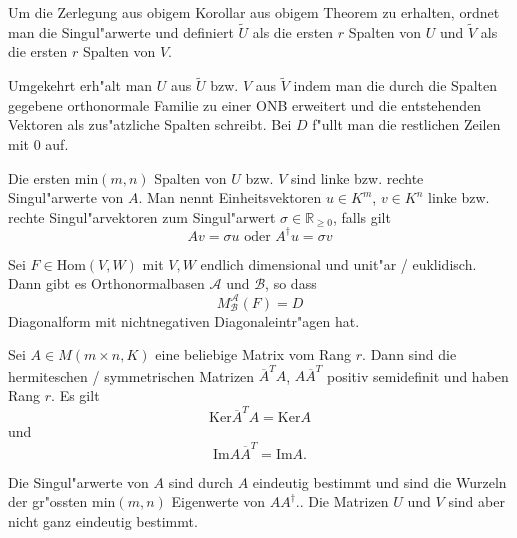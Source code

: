 \documentclass[8pt, a4paper, twocolumn, landscape]{article}
\begin{document}
{\begin{remark}
Um die Zerlegung aus obigem Korollar aus obigem Theorem zu erhalten, ordnet man die Singul"arwerte und definiert $\tilde{U}$ als die ersten $r$ Spalten von $U$ und $\tilde{V}$ als die ersten $r$ Spalten von $V$.

Umgekehrt erh"alt man $U$ aus $\tilde{U}$ bzw. $V$ aus $\tilde{V}$ indem man die durch die Spalten gegebene orthonormale Familie zu einer ONB erweitert und die entstehenden Vektoren als zus"atzliche Spalten schreibt. Bei $D$ f"ullt man die restlichen Zeilen mit $0$ auf.
\end{remark}



\begin{definition}
Die ersten $\mathrm{min}(m, n)$ Spalten von $U$ bzw. $V$ sind linke bzw. rechte Singul"arwerte von $A$. Man nennt Einheitsvektoren $u \in K^m$, $v \in K^n$ linke bzw. rechte Singul"arvektoren zum Singul"arwert $\sigma \in \mathbb{R}_{\geq 0}$, falls gilt
$$
Av = \sigma u \text{ oder } A^\dagger u = \sigma v
$$
\end{definition}

\begin{corollary}
Sei $F \in \mathrm{Hom}(V, W)$ mit $V, W$ endlich dimensional und unit"ar / euklidisch. Dann gibt es Orthonormalbasen $\mathcal{A}$ und $\mathcal{B}$, so dass 
$$
M^\mathcal{A}_\mathcal{B}(F) = D
$$
Diagonalform mit nichtnegativen Diagonaleintr"agen hat.
\end{corollary}

\begin{lemma}
Sei $A \in M (m \times n, K)$ eine beliebige Matrix vom Rang $r$. Dann sind die hermiteschen / symmetrischen Matrizen $\overline{A}^T A$, $A\overline{A}^T$ positiv semidefinit und haben Rang $r$. Es gilt
$$
\mathrm{Ker} \overline{A}^T A = \mathrm{Ker} A
$$
und
$$
\mathrm{Im} A \overline{A}^T = \mathrm{Im} A.
$$
\end{lemma}



\begin{remark}
Die Singul"arwerte von $A$ sind durch $A$ eindeutig bestimmt und sind die Wurzeln der gr"ossten $\mathrm{min}(m, n)$ Eigenwerte von $AA^\dagger$.. Die Matrizen $U$ und $V$ sind aber nicht ganz eindeutig bestimmt.
\end{remark}

}
\end{document}
